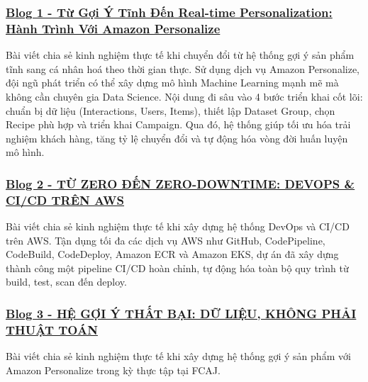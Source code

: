 \subsubsection{\texorpdfstring{\href{3.1-Blog1/}{Blog 1 - Từ Gợi Ý Tĩnh
Đến Real-time Personalization: Hành Trình Với Amazon
Personalize}}{Blog 1 - Từ Gợi Ý Tĩnh Đến Real-time Personalization: Hành Trình Với Amazon Personalize}}

Bài viết chia sẻ kinh nghiệm thực tế khi chuyển đổi từ hệ thống gợi ý
sản phẩm tĩnh sang cá nhân hoá theo thời gian thực. Sử dụng dịch vụ
Amazon Personalize, đội ngũ phát triển có thể xây dựng mô hình Machine
Learning mạnh mẽ mà không cần chuyên gia Data Science. Nội dung đi sâu
vào 4 bước triển khai cốt lõi: chuẩn bị dữ liệu (Interactions, Users,
Items), thiết lập Dataset Group, chọn Recipe phù hợp và triển khai
Campaign. Qua đó, hệ thống giúp tối ưu hóa trải nghiệm khách hàng, tăng
tỷ lệ chuyển đổi và tự động hóa vòng đời huấn luyện mô hình.

\subsubsection{\texorpdfstring{\href{3.2-Blog2/}{Blog 2 - TỪ ZERO ĐẾN
ZERO-DOWNTIME: DEVOPS \& CI/CD TRÊN
AWS}}{Blog 2 - TỪ ZERO ĐẾN ZERO-DOWNTIME: DEVOPS \& CI/CD TRÊN AWS}}

Bài viết chia sẻ kinh nghiệm thực tế khi xây dựng hệ thống DevOps và
CI/CD trên AWS. Tận dụng tối đa các dịch vụ AWS như GitHub,
CodePipeline, CodeBuild, CodeDeploy, Amazon ECR và Amazon EKS, dự án đã
xây dựng thành công một pipeline CI/CD hoàn chỉnh, tự động hóa toàn bộ
quy trình từ build, test, scan đến deploy.

\subsubsection{\texorpdfstring{\href{3.3-Blog3/}{Blog 3 - HỆ GỢI Ý THẤT
BẠI: DỮ LIỆU, KHÔNG PHẢI THUẬT
TOÁN}}{Blog 3 - HỆ GỢI Ý THẤT BẠI: DỮ LIỆU, KHÔNG PHẢI THUẬT TOÁN}}

Bài viết chia sẻ kinh nghiệm thực tế khi xây dựng hệ thống gợi ý sản
phẩm với Amazon Personalize trong kỳ thực tập tại FCAJ.
